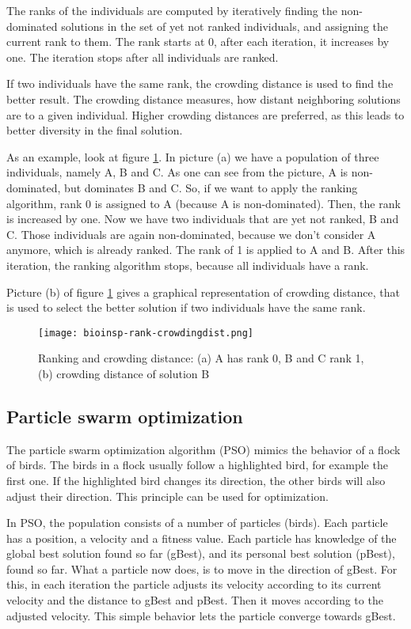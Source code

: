 The ranks of the individuals are computed by iteratively finding the non-dominated solutions in the set of yet not ranked individuals, and assigning the current rank to them. The rank starts at 0, after each iteration, it increases by one. The iteration stops after all individuals are ranked.

If two individuals have the same rank, the crowding distance is used to find the better result. The crowding distance measures, how distant neighboring solutions are to a given individual. Higher crowding distances are preferred, as this leads to better diversity in the final solution.

As an example, look at figure \ref{fig:rank-crowdingdist}. In picture (a) we have a population of three individuals, namely A, B and C. As one can see from the picture, A is non-dominated, but dominates B and C. So, if we want to apply the ranking algorithm, rank 0 is assigned to A (because A is non-dominated). Then, the rank is increased by one. Now we have two individuals that are yet not ranked, B and C. Those individuals are again non-dominated, because we don't consider A anymore, which is already ranked. The rank of 1 is applied to A and B. After this iteration, the ranking algorithm stops, because all individuals have a rank.

Picture (b) of figure \ref{fig:rank-crowdingdist} gives a graphical representation of crowding distance, that is used to select the better solution if two individuals have the same rank.

\begin{figure}[ht!]
  \centering
  \texttt{[image: bioinsp-rank-crowdingdist.png]}
  \caption{Ranking and crowding distance: (a) A has rank 0, B and C rank 1, (b) crowding distance of solution B}
  \label{fig:rank-crowdingdist}
\end{figure}

\subsection{Particle swarm optimization}
The particle swarm optimization algorithm (PSO) mimics the behavior of a flock of birds. The birds in a flock usually follow a highlighted bird, for example the first one. If the highlighted bird changes its direction, the other birds will also adjust their direction. This principle can be used for optimization.

In PSO, the population consists of a number of particles (birds). Each particle has a position, a velocity and a fitness value. Each particle has knowledge of the global best solution found so far (gBest), and its personal best solution (pBest), found so far. What a particle now does, is to move in the direction of gBest. For this, in each iteration the particle adjusts its velocity according to its current velocity and the distance to gBest and pBest. Then it moves according to the adjusted velocity. This simple behavior lets the particle converge towards gBest.

